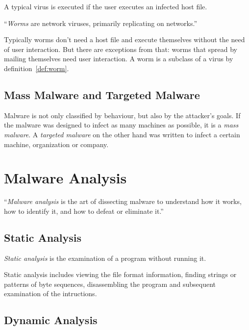 A typical virus is executed if the user executes an infected host file.

\begin{definition}[Worm]
\enquote{\emph{Worms} are network viruses, primarily replicating on networks.} \cite[]{szor05} \label{def:worm}
\end{definition} 

Typically worms don't need a host file and execute themselves without the need of user interaction. \cite[]{szor05} But there are exceptions from that: \eg{} worms that spread by mailing themselves need user interaction.
A worm is a subclass of a virus by definition~\ref{def:worm}.

\subsection{Mass Malware and Targeted Malware}

Malware is not only classified by behaviour, but also by the attacker's goals. If the malware was designed to infect as many machines as possible, it is a \emph{mass malware}. A \emph{targeted malware} on the other hand was written to infect a certain machine, organization or company.

\section{Malware Analysis} 

\begin{definition}
\enquote{\emph{Malware analysis} is the art of dissecting malware to understand how it
works, how to identify it, and how to defeat or eliminate it.} \cite[]{sikorski12}
\end{definition} 

\subsection*{Static Analysis}

\begin{definition}
\emph{Static analysis} is the examination of a program without running it. \cite[]{sikorski12}
\end{definition} 

Static analysis includes \eg{} viewing the file format information, finding strings or patterns of byte sequences, disassembling the program and subsequent examination of the intructions.

\subsection*{Dynamic Analysis}

